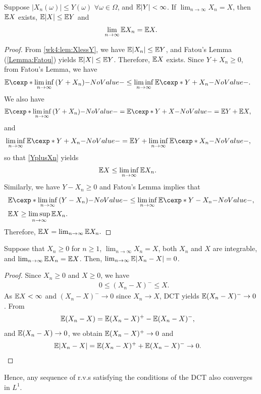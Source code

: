 \documentclass[12pt]{article}
\begin{document}
\begin{Theorem}\label{Dominated Convergence Theorem}
Suppose $|X_n(\omega)| \leq Y(\omega)$ $\forall \omega\in\Omega$, and $\E |Y|< \infty$. If $\lim_{n\to \infty}{X_n}=X$, then $\E X$ exists, $\E|X|\leq \E Y$ and 
\begin{align*}
\lim_{n \to \infty}{\E X_n} = \E X. 
\end{align*}
\end{Theorem}
\begin{proof}
From \cref{wk4:lem:XlessY}, we have $\E|X_n|\leq \E Y$, and Fatou's Lemma (\cref{Lemma:Fatou}) yields $\E|X|\leq \E Y$. Therefore, $\E X$ exists. Since $Y + X_n \geq 0$, from Fatou's Lemma, we have
\begin{align}
& \E [\liminf_{n \to \infty}{(Y+X_n)}]\leq  \liminf_{n \to \infty}{ \E [Y+X_n]}.\label{YplusXn}
\end{align}
We also have
\begin{align*}
& \E [\liminf_{n \to \infty}{(Y+X_n)}]= \E [Y+X]=\E Y +\E X,
\end{align*}
and 
\begin{align*}
& \liminf_{n \to \infty}{ \E [Y+X_n]}=\E Y +\liminf_{n \to \infty}{ \E [X_n]},
\end{align*}
so that \cref{YplusXn} yields
\begin{align*}
& \E X \leq \liminf_{n \to \infty}{ \E X_n}.
\end{align*}
Similarly, we have $Y-X_n\geq 0$ and Fatou's Lemma implies that
\begin{align*}
& \E [\liminf_{n \to \infty}{(Y-X_n)}]\leq  \liminf_{n \to \infty}{ \E [Y-X_n]},\\
& \E X \geq \limsup_{n \to \infty}{ \E X_n}.
\end{align*}
Therefore, $\E X = \lim_{n \to \infty}{ \E X_n}.$
\end{proof}

\begin{Lemma}[Scheffe] \label{Lemma:Scheffe's Lemma}
Suppose that $X_n\geq 0$ for $n\geq1$, $\lim_{n\to \infty}{X_n}= X$, both $X_n$ and $X$ are integrable, and $\lim_{n\to \infty}{\E X_n}= \E X$. Then, $\lim_{n\to \infty}{\E |X_n-X|}=0$.
\end{Lemma}
\begin{proof}
Since $X_n\geq 0$ and $X\geq0$, we have
\begin{align*}
&0\leq (X_n-X)^- \leq X.
\end{align*}
As $\E X <\infty$ and $(X_n-X)^- \to 0$ since $X_n \to X$, DCT yields $\E(X_n-X)^- \to 0$. From
\begin{align*}
&\E (X_n-X)=\E (X_n-X)^+-\E (X_n-X)^-,
\end{align*}
and $\E (X_n-X) \to 0$, we obtain $\E (X_n-X)^+ \to 0$ and
\begin{align*}
\E |X_n-X|&=\E (X_n-X)^++\E (X_n-X)^-\to 0.
\end{align*}
\end{proof}
Hence, any sequence of r.v.s satisfying the conditions of the DCT also converges in $L^1$. 
\end{document}
